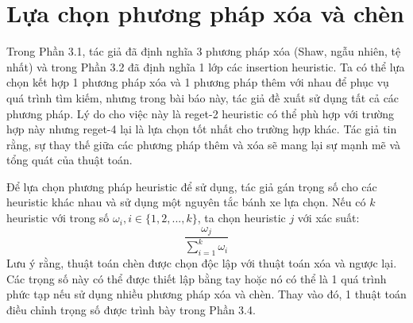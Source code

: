 \section{Lựa chọn phương pháp xóa và chèn}
Trong Phần 3.1, tác giả đã định nghĩa 3 phương pháp xóa (Shaw, ngẫu nhiên, tệ nhất) và trong Phần 3.2 đã định nghĩa 1 lớp các insertion heuristic. Ta có thể lựa chọn kết hợp 1 phương pháp xóa và 1 phương pháp thêm với nhau để phục vụ quá trình tìm kiếm, nhưng trong bài báo này, tác giả đề xuất sử dụng tất cả các phương pháp. Lý do cho việc này là reget-2 heuristic có thể phù hợp với trường hợp này nhưng reget-4 lại là lựa chọn tốt nhất cho trường hợp khác. Tác giả tin rằng, sự thay thế giữa các phương pháp thêm và xóa sẽ mang lại sự mạnh mẽ và tổng quát của thuật toán.

Để lựa chọn phương pháp heuristic để sử dụng, tác giả gán trọng số cho các heuristic khác nhau và sử dụng một nguyên tắc bánh xe lựa chọn. Nếu có $k$ heuristic với trong số $\omega_i, i \in \{1,2,...,k\}$, ta chọn heuristic $j$ với xác suất:
\begin{equation}
  \frac{\omega_j}{\sum_{i=1}^k \omega_i}
  \label{eq:20}
\end{equation}
Lưu ý rằng, thuật toán chèn được chọn độc lập với thuật toán xóa và ngược lại. Các trọng số này có thể được thiết lập bằng tay hoặc nó có thể là 1 quá trình phức tạp nếu sử dụng nhiều phương pháp xóa và chèn. Thay vào đó, 1 thuật toán điều chỉnh trọng số được trình bày trong Phần 3.4.
